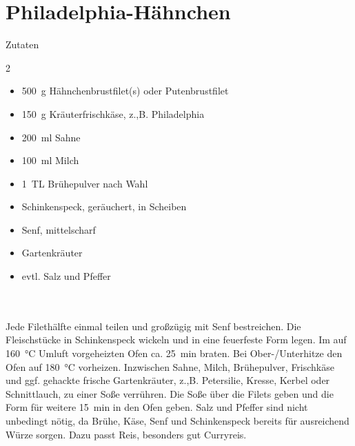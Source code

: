 \section*{Philadelphia-Hähnchen}
\ihead{}\ohead{}
\cfoot{}
{\Large Zutaten}
\begin{multicols}{2}
\begin{itemize}
\item \SI{500}{g} Hähnchenbrustfilet(s) oder Putenbrustfilet
\item \SI{150}{g} Kräuterfrischkäse, z.,B. Philadelphia
\item \SI{200}{ml} Sahne
\item \SI{100}{ml} Milch
\item \SI{1}{TL} Brühepulver nach Wahl
\item Schinkenspeck, geräuchert, in Scheiben
\item Senf, mittelscharf
\item Gartenkräuter
\item evtl. Salz und Pfeffer
\end{itemize}
\end{multicols}
\\
\\
Jede Filethälfte einmal teilen und großzügig mit Senf bestreichen.
Die Fleischstücke in Schinkenspeck wickeln und in eine feuerfeste Form legen.
Im auf \SI{160}{\degreeCelsius} Umluft vorgeheizten Ofen ca. \SI{25}{min} braten.
Bei Ober-/Unterhitze den Ofen auf \SI{180}{\degreeCelsius} vorheizen.
Inzwischen Sahne, Milch, Brühepulver, Frischkäse und ggf. gehackte frische Gartenkräuter, z.,B. Petersilie, Kresse, Kerbel oder Schnittlauch, zu einer Soße verrühren.
Die Soße über die Filets geben und die Form für weitere \SI{15}{min} in den Ofen geben.
Salz und Pfeffer sind nicht unbedingt nötig, da Brühe, Käse, Senf und Schinkenspeck bereits für ausreichend Würze sorgen.
Dazu passt Reis, besonders gut Curryreis.
